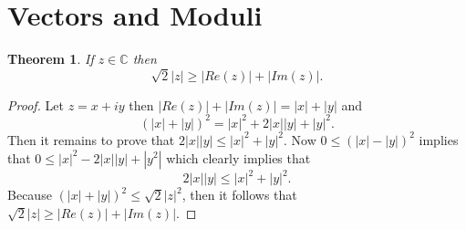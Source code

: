 \documentclass[letter]{article}
\newtheorem{theorem}{Theorem}
\newenvironment{menumerate}{%
  \edef\backupindent{\the\parindent}%
  \enumerate%
  \setlength{\parindent}{\backupindent}%
}{\endenumerate}
\begin{document}
\setcounter{section}{4}
\section{Vectors and Moduli}
\begin{menumerate}
	\setcounter{enumi}{3}
	\item \begin{theorem}
		If $z \in \mathbb{C}$ then 
		\begin{equation}
			\sqrt{2}|z| \geq |Re(z)| + |Im(z)|.
		\end{equation}
	\end{theorem}
	\begin{proof}
		Let $z = x +iy$ then $|Re(z)| + |Im(z)| = |x| + |y|$ and 
		\begin{equation}
			(|x| + |y|)^2 =|x|^2 + 2|x||y| + |y|^2.
		\end{equation}
		Then it remains to prove that $2|x||y| \leq |x|^2 + |y|^2.$ Now $0 \leq (|x| -|y|)^2$ implies that $0 \leq |x|^2 - 2|x||y| + |y^2|$ which clearly implies that \begin{equation}
			2|x||y| \leq |x|^2 + |y|^2.
		\end{equation}Because $(|x| + |y|)^2 \leq \sqrt{2}|z|^2$, then it follows that $\sqrt{2}|z| \geq |Re(z)| + |Im(z)|.$
	\end{proof}


\end{menumerate}
\end{document}
